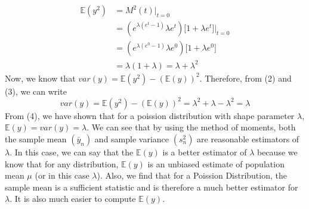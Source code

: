 \documentclass[11pt]{article}
\begin{document}
\begin{equation}
  \begin{aligned}
    \mathbb{E}(y^{2}) & = M^{2}(t) \rvert_{t = 0}\\
    & = (e^{\lambda(e^{t} -1)}\lambda e^{t})\bigg[1 + \lambda e^{t}\bigg] \rvert_{t = 0}\\
    & = (e^{\lambda(e^{0} -1)}\lambda e^{0})\bigg[1 + \lambda e^{0}\bigg]\\
    & = \lambda(1 + \lambda) = \lambda + \lambda^{2}
  \end{aligned}
\end{equation}
Now, we know that $var(y) = \mathbb{E}(y^{2}) - (\mathbb{E}(y))^{2}$. Therefore, from (2) and (3), we can write
\begin{equation}
  var(y) = \mathbb{E}(y^{2}) - (\mathbb{E}(y))^{2} = \lambda^{2} + \lambda - \lambda^{2} = \lambda
\end{equation}
From (4), we have shown that for a poission distribution with shape parameter $\lambda$, $\mathbb{E}(y) = var(y) = \lambda$. We can see that by using the method of moments, both the sample mean $(\bar y_{n})$ and sample variance $(s_{n}^{2})$ are reasonable estimators of $\lambda$. In this case, we can say that the $\mathbb{E}(y)$ is a better estimator of $\lambda$ because we know that for any distribution, $\mathbb{E}(y)$ is an unbiased estimate of population mean $\mu$ (or in this case $\lambda$). Also, we find that for a Poission Distribution, the sample mean is a sufficient statistic and is therefore a much better estimator for $\lambda$. It is also much easier to compute $\mathbb{E}(y)$.\\ \\
\end{document}
